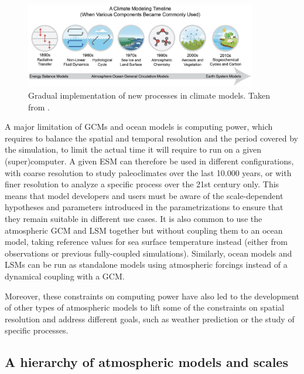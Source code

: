 \begin{figure}[hbtp]
    \centering
    \includegraphics[width=0.9\textwidth]{images/intro/climate_modelling_evolution_kotamarthi.png}
    \caption{Gradual implementation of new processes in climate models. Taken from \citep{kotamarthi_downscaling_2021}. 
    }
    \label{fig:GCM_processes}
\end{figure}

A major limitation of GCMs and ocean models is computing power, which requires to balance the spatial and temporal resolution and the period covered by the simulation, to limit the actual time it will require to run on a given (super)computer. A given ESM can therefore be used in different configurations, with coarse resolution to study paleoclimates over the last 10.000 years, or with finer resolution to analyze a specific process over the 21st century only. This means that model developers and users must be aware of the scale-dependent hypotheses and parameters introduced in the parametrizations to ensure that they remain suitable in different use cases.
It is also common to use the atmospheric GCM and LSM together but without coupling them to an ocean model, taking reference values for sea surface temperature instead (either from observations or previous fully-coupled simulations). Similarly, ocean models and LSMs can be run as standalone models using atmospheric forcings instead of a dynamical coupling with a GCM. 

Moreover, these constraints on computing power have also led to the development of other types of atmospheric models to lift some of the constraints on spatial resolution and address different goals, such as weather prediction or the study of specific processes. 

\subsection{A hierarchy of atmospheric models and scales}

